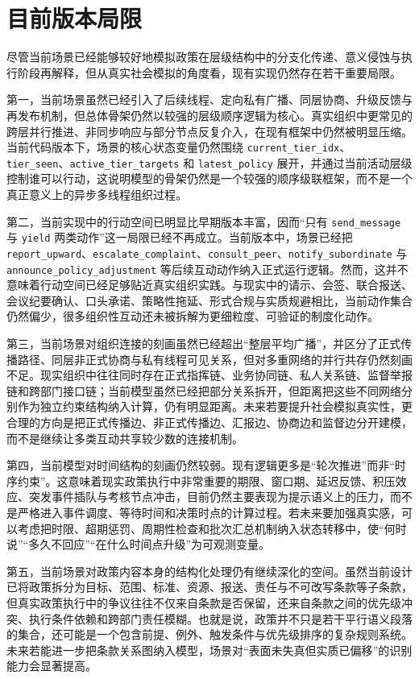\documentclass{article}
\begin{document}
\section{目前版本局限}

尽管当前场景已经能够较好地模拟政策在层级结构中的分支化传递、意义侵蚀与执行阶段再解释，但从真实社会模拟的角度看，现有实现仍然存在若干重要局限。

第一，当前场景虽然已经引入了后续线程、定向私有广播、同层协商、升级反馈与再发布机制，但总体骨架仍然以较强的层级顺序逻辑为核心。真实组织中更常见的跨层并行推进、非同步响应与部分节点反复介入，在现有框架中仍然被明显压缩。当前代码版本下，场景的核心状态变量仍然围绕 \texttt{current\_tier\_idx}、\texttt{tier\_seen}、\texttt{active\_tier\_targets} 和 \texttt{latest\_policy} 展开，并通过当前活动层级控制谁可以行动，这说明模型的骨架仍然是一个较强的顺序级联框架，而不是一个真正意义上的异步多线程组织过程。

第二，当前实现中的行动空间已明显比早期版本丰富，因而“只有 \texttt{send\_message} 与 \texttt{yield} 两类动作”这一局限已经不再成立。当前版本中，场景已经把 \texttt{report\_upward}、\texttt{escalate\_complaint}、\texttt{consult\_peer}、\texttt{notify\_subordinate} 与 \texttt{announce\_policy\_adjustment} 等后续互动动作纳入正式运行逻辑。然而，这并不意味着行动空间已经足够贴近真实组织实践。与现实中的请示、会签、联合报送、会议纪要确认、口头承诺、策略性拖延、形式合规与实质规避相比，当前动作集合仍然偏少，很多组织性互动还未被拆解为更细粒度、可验证的制度化动作。

第三，当前场景对组织连接的刻画虽然已经超出“整层平均广播”，并区分了正式传播路径、同层非正式协商与私有线程可见关系，但对多重网络的并行共存仍然刻画不足。现实组织中往往同时存在正式指挥链、业务协同链、私人关系链、监督举报链和跨部门接口链；当前模型虽然已经把部分关系拆开，但距离把这些不同网络分别作为独立约束结构纳入计算，仍有明显距离。未来若要提升社会模拟真实性，更合理的方向是把正式传播边、非正式传播边、汇报边、协商边和监督边分开建模，而不是继续让多类互动共享较少数的连接机制。

第四，当前模型对时间结构的刻画仍然较弱。现有逻辑更多是“轮次推进”而非“时序约束”。这意味着现实政策执行中非常重要的期限、窗口期、延迟反馈、积压效应、突发事件插队与考核节点冲击，目前仍然主要表现为提示语义上的压力，而不是严格进入事件调度、等待时间和决策时点的计算过程。若未来要加强真实感，可以考虑把时限、超期惩罚、周期性检查和批次汇总机制纳入状态转移中，使“何时说”“多久不回应”“在什么时间点升级”为可观测变量。

第五，当前场景对政策内容本身的结构化处理仍有继续深化的空间。虽然当前设计已将政策拆分为目标、范围、标准、资源、报送、责任与不可改写条款等子条款，但真实政策执行中的争议往往不仅来自条款是否保留，还来自条款之间的优先级冲突、执行条件依赖和跨部门责任模糊。也就是说，政策并不只是若干平行语义段落的集合，还可能是一个包含前提、例外、触发条件与优先级排序的复杂规则系统。未来若能进一步把条款关系图纳入模型，场景对“表面未失真但实质已偏移”的识别能力会显著提高。
\end{document}
